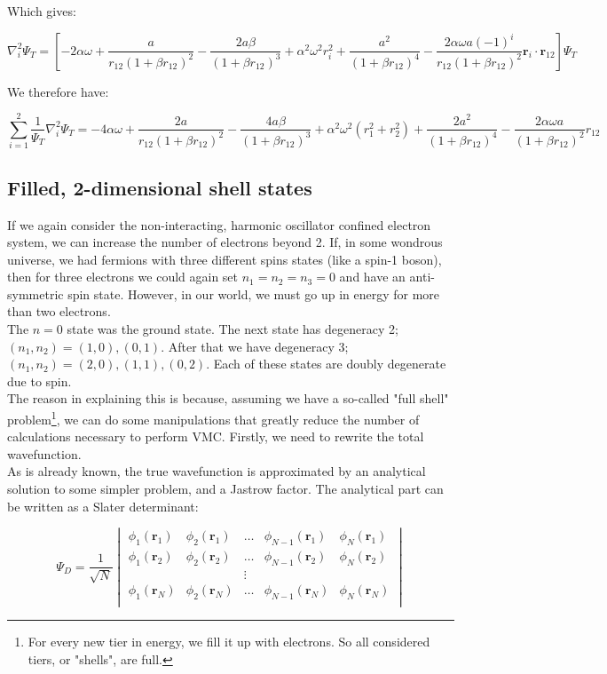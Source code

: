 \documentclass[english, a4paper]{article}
\newcommand{\bm}[1]{\mathbf{#1}}
\begin{document}
Which gives:

\begin{equation}
	\nabla_i^2\Psi_T = \left[-2\alpha\omega + \frac{a}{r_{12}(1+\beta r_{12})^2} - \frac{2a\beta}{(1+\beta r_{12})^3} + \alpha^2\omega^2r_i^2 + \frac{a^2}{(1+\beta r_{12})^4} - \frac{2\alpha\omega a(-1)^i}{r_{12}(1+\beta r_{12})^2}\bm{r}_i\cdot\bm{r}_{12}\right] \Psi_T
\end{equation}

We therefore have:

\begin{equation}
	\sum_{i=1}^2\frac{1}{\Psi_T}\nabla_i^2\Psi_T = -4\alpha\omega + \frac{2a}{r_{12}(1+\beta r_{12})^2} - \frac{4a\beta}{(1+\beta r_{12})^3} + \alpha^2\omega^2(r_1^2 + r_2^2) + \frac{2a^2}{(1+\beta r_{12})^4} - \frac{2\alpha\omega a}{(1+\beta r_{12})^2}r_{12}
\end{equation}

\subsection{Filled, 2-dimensional shell states}
If we again consider the non-interacting, harmonic oscillator confined electron system, we can increase the number of electrons beyond 2. If, in some wondrous universe, we had fermions with three different spins states (like a spin-1 boson), then for three electrons we could again set $n_1=n_2=n_3 = 0$ and have an anti-symmetric spin state. However, in our world, we must go up in energy for more than two electrons.\\
The $n=0$ state was the ground state. The next state has degeneracy 2; $(n_1,n_2) = (1,0), (0,1)$. After that we have degeneracy 3;$(n_1,n_2) = (2,0), (1,1), (0,2)$. Each of these states are doubly degenerate due to spin.\\

The reason in explaining this is because, assuming we have a so-called "full shell" problem\footnote{For every new tier in energy, we fill it up with electrons. So all considered tiers, or "shells", are full.}, we can do some manipulations that greatly reduce the number of calculations necessary to perform VMC. Firstly, we need to rewrite the total wavefunction.\\
As is already known, the true wavefunction is approximated by an analytical solution to some simpler problem, and a Jastrow factor. The analytical part can be written as a Slater determinant:

\begin{equation}
	\Psi_{D} = \frac{1}{\sqrt{N}}
		\begin{vmatrix}
		\phi_1(\bm{r}_1) & \phi_2(\bm{r}_1) & \ldots & \phi_{N-1}(\bm{r}_1) & \phi_N(\bm{r}_1)\\
		\phi_1(\bm{r}_2) & \phi_2(\bm{r}_2) & \ldots & \phi_{N-1}(\bm{r}_2) & \phi_N(\bm{r}_2)\\
		& & \vdots & &\\
		\phi_1(\bm{r}_N) & \phi_2(\bm{r}_N) & \ldots & \phi_{N-1}(\bm{r}_N) & \phi_N(\bm{r}_N)\\
		\end{vmatrix}
\end{equation}
\end{document}
